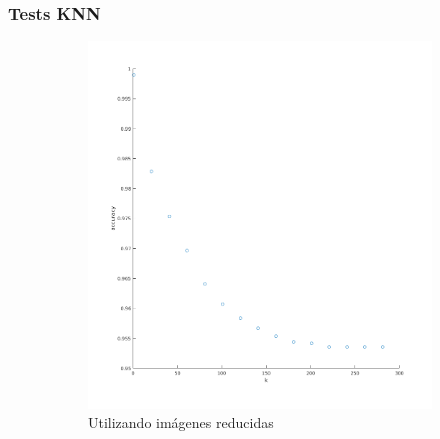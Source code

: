 


\subsubsection*{Tests KNN}

\begin{figure}[H]
\begin{subfigure}[h]{0.62\linewidth}
\includegraphics[width=\linewidth]{img/k_knn_accu.png}
\caption{Utilizando imágenes reducidas}
\end{subfigure}
\hfill
\begin{subfigure}[h]{0.62\linewidth}

\end{subfigure}
\end{figure}
